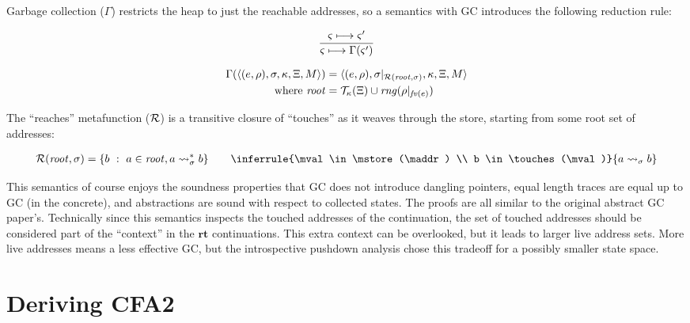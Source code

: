 Garbage collection ($\Gamma$) restricts the heap to just the reachable addresses, so a semantics with GC introduces the following reduction rule:
\begin{center}
  \begin{minipage}{0.3\linewidth}
    \begin{align*}
      \frac{\varsigma \longmapsto \varsigma'}{\varsigma \longmapsto \Gamma(\varsigma')}
    \end{align*}
  \end{minipage}
  \begin{minipage}{0.65\linewidth}
    \begin{align*}
      \Gamma(\langle (e,\rho),\sigma,\kappa, \Xi, M \rangle) &= \langle (e,\rho),\sigma|_{{\mathcal R}(\mathit{root}, \sigma)}, \kappa, \Xi, M \rangle \\
      \text{where } \mathit{root} &= {\mathcal T}_{\kappa}(\Xi) \cup
      \mathit{rng}(\rho|_{\mathit{fv}(e)})
    \end{align*}
  \end{minipage}
\end{center}
%
The ``reaches'' metafunction (${\mathcal R}$) is a transitive closure of ``touches'' as it weaves through the store, starting from some root set of addresses:

\begin{align*}
  \reaches(\mathit{root}, \mstore) = \setbuild{b}{\maddr \in \mathit{root}, \maddr \rightsquigarrow_\mstore^* b}
   \qquad
               \inferrule{\mval \in \mstore(\maddr) \\
                             b \in \touches(\mval)}
                            {\maddr \rightsquigarrow_\mstore b}
\end{align*}

This semantics of course enjoys the soundness properties that GC does not introduce dangling pointers, equal length traces are equal up to GC (in the concrete), and abstractions are sound with respect to collected states.
%
The proofs are all similar to the original abstract GC paper's.
%
Technically since this semantics inspects the touched addresses of the continuation, the set of touched addresses should be considered part of the ``context'' in the $\mathbf{rt}$ continuations.
%
This extra context can be overlooked, but it leads to larger live address sets.
%
More live addresses means a less effective GC, but the introspective pushdown analysis chose this tradeoff for a possibly smaller state space.
%

\section{Deriving CFA2}
\label{sec:cfa2}

